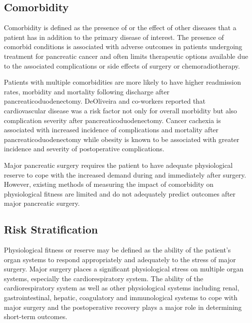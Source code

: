 \subsection{Comorbidity}
Comorbidity is defined as the presence of or the effect of other diseases that a patient has in addition to the primary disease of interest. The presence of comorbid conditions is associated with adverse outcomes in patients undergoing treatment for pancreatic cancer\parencite{mann_review_2010} and often limits therapeutic options available due to the associated complications or side effects of surgery or chemoradiotherapy.\parencite{sandroussi_sociodemographics_2010}

Patients with multiple comorbidities are more likely to have higher readmission rates, morbidity and mortality following discharge after pancreaticoduodenectomy.\parencite{schneider_patient_2012} DeOliveira and co-workers reported that cardiovascular disease was a risk factor not only for overall morbidity but also complication severity after pancreaticoduodenectomy.\parencite{deoliveira_assessment_2006} Cancer cachexia is associated with increased incidence of complications and mortality after pancreaticoduodenectomy\parencite{pausch_cachexia_2012} while obesity is known to be associated with greater incidence and severity of postoperative complications.\parencite{benns_impact_2009}

Major pancreatic surgery requires the patient to have adequate physiological reserve to cope with the increased demand during and immediately after surgery. However, existing methods of measuring the impact of comorbidity on physiological fitness are limited and do not adequately predict outcomes after major pancreatic surgery. \parencite{shah_limitations_2012}

\subsection{Risk Stratification}
Physiological fitness or reserve may be defined as the ability of the patient’s organ systems to respond appropriately and adequately to the stress of major surgery. Major surgery places a significant physiological stress on multiple organ systems, especially the cardiorespiratory system. The ability of the cardiorespiratory system as well as other physiological systems including renal, gastrointestinal, hepatic, coagulatory and immunological systems to cope with major surgery and the postoperative recovery plays a major role in determining short-term outcomes. 

